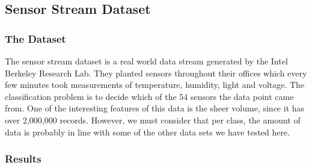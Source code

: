 \documentclass[12pt,a4paper,oneside]{report}
\begin{document}
\subsection*{Sensor Stream Dataset}
\subsubsection*{The Dataset}
The sensor stream dataset is a real world data stream generated by the Intel Berkeley Research Lab. They planted sensors throughout their offices which every few minutes took measurements of temperature, humidity, light and voltage. The classification problem is to decide which of the 54 sensors the data point came from. One of the interesting features of this data is the sheer volume, since it has over 2,000,000 records. However, we must consider that per class, the amount of data is probably in line with some of the other data sets we have tested here.  

\subsubsection*{Results}
\end{document}
